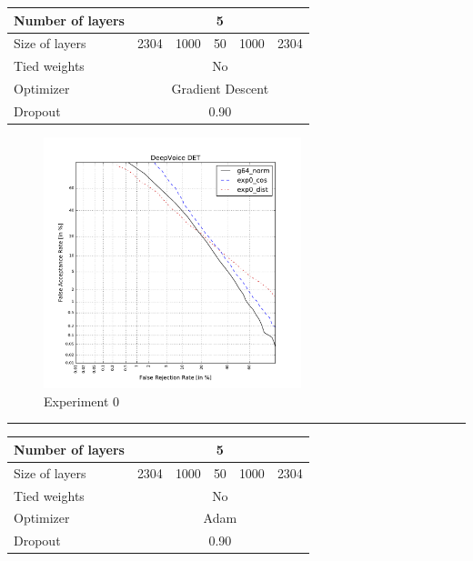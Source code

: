 \documentclass[conference]{IEEEtran}
\begin{document}
\appendix

\begin{table}[!h]
\centering
\begin{tabular}{|l|c|c|c|c|c|}
\hline
Number of layers & \multicolumn{5}{c|}{5}                \\ \hline
Size of layers   & 2304   & 1000   & 50  & 1000  & 2304  \\ \hline
Tied weights     & \multicolumn{5}{c|}{No}               \\ \hline
Optimizer        & \multicolumn{5}{c|}{Gradient Descent} \\ \hline
Dropout          & \multicolumn{5}{c|}{0.90} \\ \hline
\end{tabular}
\end{table}

\begin{figure}[!h]
    \centering
    \includegraphics[width=7.5cm]{../scores/det0.pdf}
    \captionsetup{labelformat=empty}
    \caption{Experiment 0}
\end{figure}

\hrule
\vspace{0.5cm}

\begin{table}[!h]
\centering
\begin{tabular}{|l|c|c|c|c|c|}
\hline
Number of layers & \multicolumn{5}{c|}{5}                \\ \hline
Size of layers   & 2304   & 1000   & 50  & 1000  & 2304  \\ \hline
Tied weights     & \multicolumn{5}{c|}{No}               \\ \hline
Optimizer        & \multicolumn{5}{c|}{Adam} \\ \hline
Dropout          & \multicolumn{5}{c|}{0.90} \\ \hline
\end{tabular}
\end{table}
\end{document}

